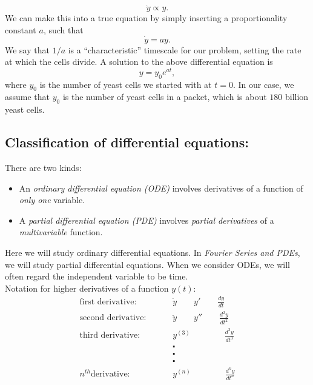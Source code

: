 \begin{equation*}
  \dot{y} \propto y.  
\end{equation*}
We can make this into a true equation by simply inserting a proportionality constant $a$, such that
\begin{equation*}
  \dot{y} = ay. 
\end{equation*}
We say that $1/a$ is a ``characteristic'' timescale for our problem, setting the rate at which the cells divide. A solution to the above differential equation is
\begin{equation*}
  y = y_0e^{at},
\end{equation*}
where $y_0$ is the number of yeast cells we started with at $t=0$.
In our case, we assume that $y_0$ is the number of yeast cells in a packet, which is about $180$ billion yeast cells.
\clearpage

\subsection{Classification of differential equations:}
There are two kinds:
\begin{itemize}
\item An \emph{\color{blue} ordinary differential equation (ODE)}  involves derivatives of a function of \emph{only one} variable.
\item A \emph{\color{blue} partial differential equation (PDE)} involves \emph{partial derivatives} of a \emph{multivariable} function.
\end{itemize}

Here we will study ordinary differential equations. In \textit{Fourier Series and PDEs}, we will study partial differential equations. When we consider ODEs, we will often regard the independent variable to be time.\\

Notation for higher derivatives of a function $y(t)$:
\begin{align*}
  \text{first derivative: } \qquad  &\dot{y}\qquad y'\qquad \frac{dy}{dt}\\
  \text{second derivative: } \qquad  &\ddot{y}\qquad y''\qquad \frac{d^2y}{dt^2}\\
  \text{third derivative: } \qquad  &y^{(3)}\qquad \qquad \frac{d^3y}{dt^3}\\
                                    &\centerdot \\
                                    &\centerdot \\
                                    &\centerdot \\
  n^{th} \text{derivative: } \qquad &y^{(n)}\qquad \qquad \frac{d^ny}{dt^n}                              
\end{align*}

